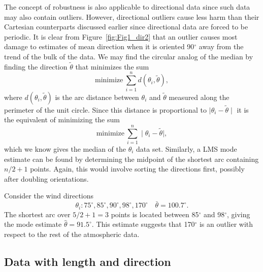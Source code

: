 	The concept of robustness is also applicable to directional data since such data may also contain outliers.
However, directional outliers cause less harm than their Cartesian counterparts discussed earlier since directional data are forced
to be periodic.  It is clear from Figure~\ref{fig:Fig1_dir2} that an outlier causes most damage to estimates of mean direction when it is oriented
90$^{\circ}$ away from the trend of the bulk of the data.
We may find the circular analog of the median by finding the direction $\tilde{\theta}$ that minimizes the sum
\begin{equation}
\mbox{minimize} \  \sum^n_{i=1} d \left( \theta_i, \tilde{ \theta} \right),
\end{equation}
where $d\left( \theta_i, \tilde{\theta}\right)$ is the arc distance between $\theta_i$ and 
$ \tilde{ \theta} $ measured along the perimeter of the unit circle.  Since this distance is proportional
to $\mid \theta_i - \tilde{ \theta} \mid$   it is the equivalent of minimizing the sum
\begin{equation}
\mbox{minimize}  \ \sum^n_{i=1} \mid \theta_i - \tilde{ \theta} \mid,
\end{equation}
which we know gives the median of the $ \theta_i$ data set.  Similarly, a LMS mode estimate can be found by
determining the midpoint of the shortest arc containing $n/2+1$ points.  Again, this would involve sorting
the directions first, possibly after doubling orientations.
\begin{example}
Consider the wind directions
$$
\theta_i: 75^{\circ}, 85^{\circ}, 90^{\circ}, 98^{\circ}, 170^{\circ} \quad 
\bar{ \theta}=100.7^{\circ}.
$$	 
The shortest arc over $5/2+1=3$ points is located between 85$^{\circ}$ and 98$^{\circ}$, giving the mode
estimate $\hat{\theta} = 91.5^{\circ}$. This estimate suggests that 170$^{\circ}$ is an outlier
with respect to the rest of the atmospheric data.
\end{example}

\subsection{Data with length and direction}

